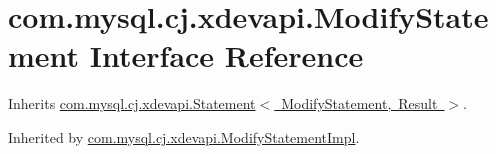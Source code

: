 \hypertarget{interfacecom_1_1mysql_1_1cj_1_1xdevapi_1_1_modify_statement}{}\section{com.\+mysql.\+cj.\+xdevapi.\+Modify\+Statement Interface Reference}
\label{interfacecom_1_1mysql_1_1cj_1_1xdevapi_1_1_modify_statement}


Inherits \mbox{\hyperlink{interfacecom_1_1mysql_1_1cj_1_1xdevapi_1_1_statement}{com.\+mysql.\+cj.\+xdevapi.\+Statement$<$ Modify\+Statement, Result $>$}}.



Inherited by \mbox{\hyperlink{classcom_1_1mysql_1_1cj_1_1xdevapi_1_1_modify_statement_impl}{com.\+mysql.\+cj.\+xdevapi.\+Modify\+Statement\+Impl}}.

